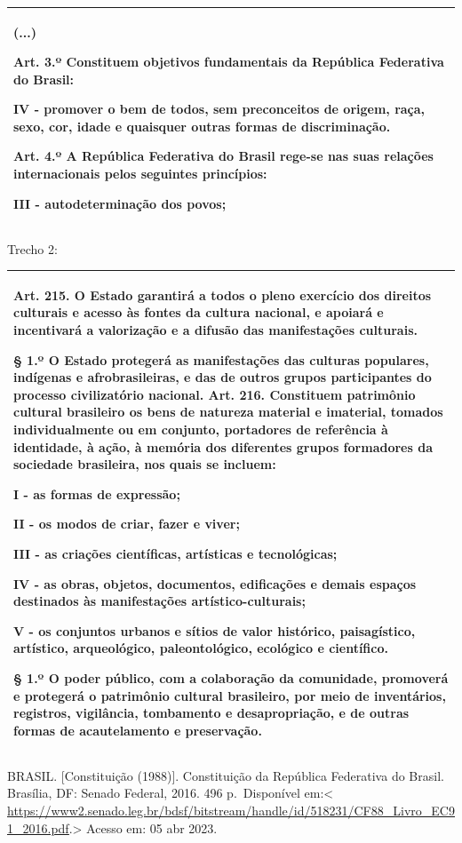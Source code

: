 {\begin{longtable}[]{@{}
  >{\raggedright\arraybackslash}p{}@{}}
(...)

Art. 3.º Constituem objetivos fundamentais da República Federativa do
Brasil:

IV - promover o bem de todos, sem preconceitos de origem, raça, sexo,
cor, idade e quaisquer outras formas de discriminação.

Art. 4.º A República Federativa do Brasil rege-se nas suas relações
internacionais pelos seguintes princípios:

III - autodeterminação dos povos; \\
\bottomrule
\end{longtable}

Trecho 2:

\begin{longtable}[]{@{}
  >{\raggedright\arraybackslash}p{}@{}}
\toprule
\endhead
Art. 215. O Estado garantirá a todos o pleno exercício dos direitos
culturais e acesso às fontes da cultura nacional, e apoiará e
incentivará a valorização e a difusão das manifestações culturais.

§ 1.º O Estado protegerá as manifestações das culturas populares,
indígenas e afrobrasileiras, e das de outros grupos participantes do
processo civilizatório nacional. Art. 216. Constituem patrimônio
cultural brasileiro os bens de natureza material e imaterial, tomados
individualmente ou em conjunto, portadores de referência à identidade, à
ação, à memória dos diferentes grupos formadores da sociedade
brasileira, nos quais se incluem:

I - as formas de expressão;

II - os modos de criar, fazer e viver;

III - as criações científicas, artísticas e tecnológicas;

IV - as obras, objetos, documentos, edificações e demais espaços
destinados às manifestações artístico-culturais;

V - os conjuntos urbanos e sítios de valor histórico, paisagístico,
artístico, arqueológico, paleontológico, ecológico e científico.

§ 1.º O poder público, com a colaboração da comunidade, promoverá e
protegerá o patrimônio cultural brasileiro, por meio de inventários,
registros, vigilância, tombamento e desapropriação, e de outras formas
de acautelamento e preservação. \\
\bottomrule
\end{longtable}

BRASIL. {[}Constituição (1988){]}. Constituição da República Federativa
do Brasil. Brasília, DF: Senado Federal, 2016. 496 p.~Disponível
em:\textless{}
\href{https://www2.senado.leg.br/bdsf/bitstream/handle/id/518231/CF88_Livro_EC91_2016.pdf}{\uline{https://www2.senado.leg.br/bdsf/bitstream/handle/id/518231/CF88\_Livro\_EC91\_2016.pdf}}.\textgreater{}
Acesso em: 05 abr 2023.

}
